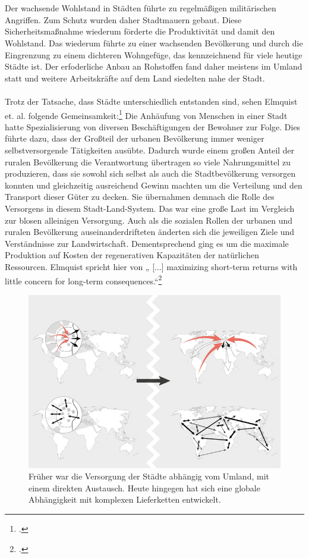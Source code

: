 \documentclass{scrartcl}
\begin{document}
\\
\\
Der wachsende Wohlstand in Städten führte zu regelmäßigen militärischen Angriffen. Zum Schutz wurden daher Stadtmauern gebaut. Diese Sicherheitsmaßnahme wiederum förderte die Produktivität und damit den Wohlstand. Das wiederum führte zu einer wachsenden Bevölkerung und durch die Eingrenzung zu einem dichteren Wohngefüge, das kennzeichnend für viele heutige Städte ist. Der erfoderliche Anbau an Rohstoffen fand daher meistens im Umland statt und weitere Arbeitskräfte auf dem Land siedelten nahe der Stadt. \\
\\
Trotz der Tatsache, dass Städte unterschiedlich entstanden sind, sehen Elmquist et. al. folgende Gemeinsamkeit:\footcite[Vgl.][S.19ff]{Elmqvist2013} Die Anhäufung von Menschen in einer Stadt hatte Spezialisierung von diversen Beschäftigungen der Bewohner zur Folge. Dies führte dazu, dass der Großteil der urbanen Bevölkerung immer weniger selbstversorgende Tätigkeiten ausübte. Dadurch wurde einem großen Anteil der ruralen Bevölkerung die Verantwortung übertragen so viele Nahrungsmittel zu produzieren, dass sie sowohl sich selbst als auch die Stadtbevölkerung versorgen konnten und gleichzeitig ausreichend Gewinn machten um die Verteilung und den Transport dieser Güter zu decken. Sie übernahmen demnach die Rolle des Versorgens in diesem Stadt-Land-System. Das war eine große Last im Vergleich zur blosen alleinigen Versorgung. Auch als die sozialen Rollen der urbanen und ruralen Bevölkerung auseinanderdrifteten änderten sich die jeweiligen Ziele und Verständnisse zur Landwirtschaft. Dementsprechend ging es um die maximale Produktion auf Kosten der regenerativen Kapazitäten der natürlichen Ressourcen. Elmquist spricht hier von  „ [...] maximizing short-term returns with little concern for long-term consequences.“\footcite[S.20]{Elmqvist2013}\\

\begin{figure}[h]
\centering
\includegraphics[width=12cm]{image_folder/connections_1.jpg}
\caption{Früher war die Versorgung der Städte abhängig vom Umland, mit einem direkten Austausch. Heute hingegen hat sich eine globale Abhängigkeit mit komplexen Lieferketten entwickelt.}
\label{fig:verbindungen}
\end{figure}
\end{document}
